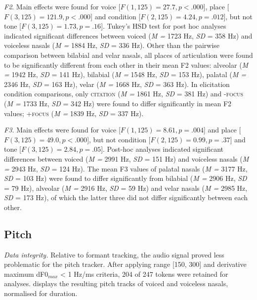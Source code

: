 \documentclass[12pt]{article}
\newcommand{\condc}{\textsc{citation }}
\newcommand{\condf}{\textsc{+focus }}
\newcommand{\condu}{\textsc{-focus }}
\begin{document}
\newpage

\emph{F2}. Main effects were found for voice [$F(1, 125) = 27.7, p < .000$], place [$F(3, 125) = 121.9, p < .000$] and condition [$F(2, 125) = 4.24, p = .012$], but not tone [$F(3, 125) = 1.73, p = .16$]. Tukey's HSD test for post hoc analyses indicated significant differences between voiced (\emph{M = } 1723 Hz, \emph{SD} = 358 Hz) and voiceless nasals (\emph{M = } 1884 Hz, \emph{SD} = 336 Hz). Other than the pairwise comparison between bilabial and velar nasals, all places of articulation were found to be significantly different from each other in their mean F2 values: alveolar (\emph{M = } 1942 Hz, \emph{SD} = 141 Hz), bilabial (\emph{M = } 1548 Hz, \emph{SD} = 153 Hz), palatal (\emph{M = } 2346 Hz, \emph{SD} = 163 Hz), velar (\emph{M = } 1668 Hz, \emph{SD} = 363 Hz). In elicitation condition comparisons, only \condc (\emph{M = } 1861 Hz, \emph{SD} = 381 Hz) and \condu (\emph{M = } 1733 Hz, \emph{SD} = 342 Hz) were found to differ significantly in mean F2 values; \condf (\emph{M = } 1839 Hz, \emph{SD} = 337 Hz).

\emph{F3.} Main effects were found for voice [$F(1, 125) = 8.61, p = .004$] and place [$F(3, 125) = 49.0, p < .000$], but not condition [$F(2, 125) = 0.99, p = .37$] and tone [$F(3, 125) = 2.84, p = .05$]. Post-hoc analyses indicated significant differences between voiced (\emph{M = } 2991 Hz, \emph{SD} = 151 Hz) and voiceless nasals (\emph{M = } 2943 Hz, \emph{SD} = 124 Hz). The mean F3 values of palatal nasals (\emph{M = } 3177 Hz, \emph{SD} = 103 Hz) were found to differ significantly from bilabial (\emph{M = } 2906 Hz, \emph{SD} = 79 Hz), alveolar (\emph{M = } 2916 Hz, \emph{SD} = 59 Hz) and velar nasals (\emph{M = } 2985 Hz, \emph{SD} = 173 Hz), of which the latter three did not differ significantly between each other.

\subsection{Pitch}

\emph{Data integrity.} Relative to formant tracking, the audio signal proved less problematic for the pitch tracker. After applying range [150, 300] and derivative maximum dF0$_{max}$ < 1 Hz/ms criteria, 204 of 247 tokens were retained for analyses.  displays the resulting pitch tracks of voiced and voiceless nasals, normalised for duration.
\end{document}
